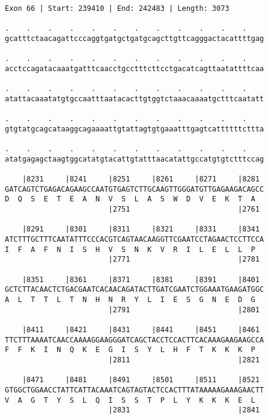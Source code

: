 \documentclass{article}
\begin{document}
\newpage
\begin{Verbatim}[fontfamily=courier]
Exon 66 | Start: 239410 | End: 242483 | Length: 3073

.    .    .    .    .    .    .    .    .    .    .    .    
gcatttctaacagattcccaggtgatgctgatgcagcttgttcagggactacattttgag

.    .    .    .    .    .    .    .    .    .    .    .    
acctccagatacaaatgatttcaacctgcctttcttcctgacatcagttaatattttcaa

.    .    .    .    .    .    .    .    .    .    .    .    
atattacaaatatgtgccaatttaatacacttgtggtctaaacaaaatgctttcaatatt

.    .    .    .    .    .    .    .    .    .    .    .    
gtgtatgcagcataaggcagaaaattgtattagtgtgaaatttgagtcattttttcttta

.    .    .    .    .    .    .    .    .    .    .    .    
atatgagagctaagtggcatatgtacattgtatttaacatattgccatgtgtctttccag

    |8231     |8241     |8251     |8261     |8271     |8281 
GATCAGTCTGAGACAGAAGCCAATGTGAGTCTTGCAAGTTGGGATGTTGAGAAGACAGCC
D  Q  S  E  T  E  A  N  V  S  L  A  S  W  D  V  E  K  T  A  
                        |2751                         |2761 

    |8291     |8301     |8311     |8321     |8331     |8341 
ATCTTTGCTTTCAATATTTCCCACGTCAGTAACAAGGTTCGAATCCTAGAACTCCTTCCA
I  F  A  F  N  I  S  H  V  S  N  K  V  R  I  L  E  L  L  P  
                        |2771                         |2781 

    |8351     |8361     |8371     |8381     |8391     |8401 
GCTCTTACAACTCTGACGAATCACAACAGATACTTGATCGAATCTGGAAATGAAGATGGC
A  L  T  T  L  T  N  H  N  R  Y  L  I  E  S  G  N  E  D  G  
                        |2791                         |2801 

    |8411     |8421     |8431     |8441     |8451     |8461 
TTCTTTAAAATCAACCAAAAGGAAGGGATCAGCTACCTCCACTTCACAAAGAAGAAGCCA
F  F  K  I  N  Q  K  E  G  I  S  Y  L  H  F  T  K  K  K  P  
                        |2811                         |2821 

    |8471     |8481     |8491     |8501     |8511     |8521 
GTGGCTGGAACCTATTCATTACAAATCAGTAGTACTCCACTTTATAAAAAGAAAGAACTT
V  A  G  T  Y  S  L  Q  I  S  S  T  P  L  Y  K  K  K  E  L  
                        |2831                         |2841 

\end{Verbatim}
\newpage
\end{document}
